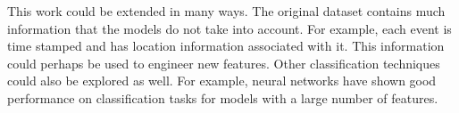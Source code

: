 \documentclass[10pt,twocolumn,letterpaper]{article}
\begin{document}
This work could be extended in many ways.  The original dataset contains much information that the models do not take into account.  For example, each event is time stamped and has location information associated with it.  This information could perhaps be used to engineer new features.  Other classification techniques could also be explored as well.  For example, neural networks have shown good performance on classification tasks for models with a large number of features.  



{\small


}
\end{document}
